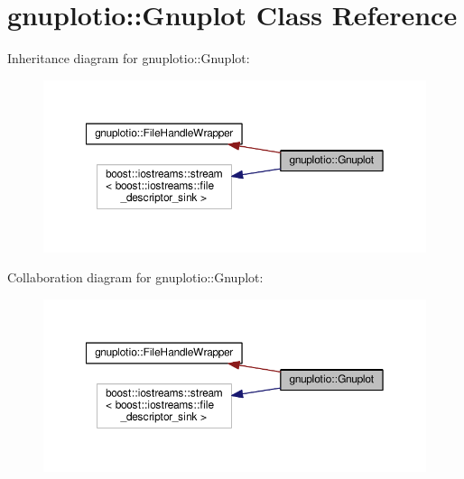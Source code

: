 \hypertarget{classgnuplotio_1_1_gnuplot}{}\section{gnuplotio\+:\+:Gnuplot Class Reference}
\label{classgnuplotio_1_1_gnuplot}


Inheritance diagram for gnuplotio\+:\+:Gnuplot\+:
\nopagebreak
\begin{figure}[H]
\begin{center}
\leavevmode
\includegraphics[width=350pt]{classgnuplotio_1_1_gnuplot__inherit__graph}
\end{center}
\end{figure}


Collaboration diagram for gnuplotio\+:\+:Gnuplot\+:
\nopagebreak
\begin{figure}[H]
\begin{center}
\leavevmode
\includegraphics[width=350pt]{classgnuplotio_1_1_gnuplot__coll__graph}
\end{center}
\end{figure}
